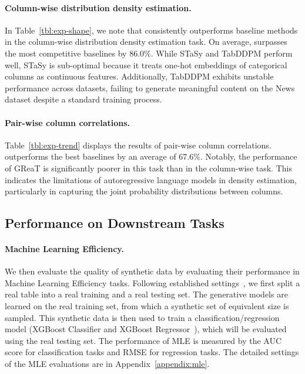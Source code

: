\paragraph{Column-wise distribution density estimation.} In Table~\ref{tbl:exp-shape}, we note that \modelname consistently outperforms baseline methods in the column-wise distribution density estimation task. On average, \modelname surpasses the most competitive baselines by $86.0\%$. While STaSy and TabDDPM perform well, STaSy is sub-optimal because it treats one-hot embeddings of categorical columns as continuous features. Additionally, TabDDPM exhibits unstable performance across datasets, failing to generate meaningful content on the News dataset despite a standard training process.

\paragraph{Pair-wise column correlations.} Table~\ref{tbl:exp-trend} displays the results of pair-wise column correlations. \modelname outperforms the best baselines by an average of $67.6\%$. Notably, the performance of GReaT is significantly poorer in this task than in the column-wise task. This indicates the limitations of autoregressive language models in density estimation, particularly in capturing the joint probability distributions between columns.

\subsection{Performance on Downstream Tasks}\label{sec:exp-downstream}
\paragraph{Machine Learning Efficiency.}
We then evaluate the quality of synthetic data by evaluating their performance in Machine Learning Efficiency tasks. Following established settings~\citep {tabddpm, stasy, codi}, we first split a real table into a real training and a real testing set. The generative models are learned on the real training set, from which a synthetic set of equivalent size is sampled. This synthetic data is then used to train a classification/regression model (XGBoost Classifier and XGBoost Regressor~\citep{xgboost}), which will be evaluated using the real testing set. The performance of MLE is measured by the AUC score for classification tasks and RMSE for regression tasks. The detailed settings of the MLE evaluations are in Appendix~\ref{appendix:mle}.

